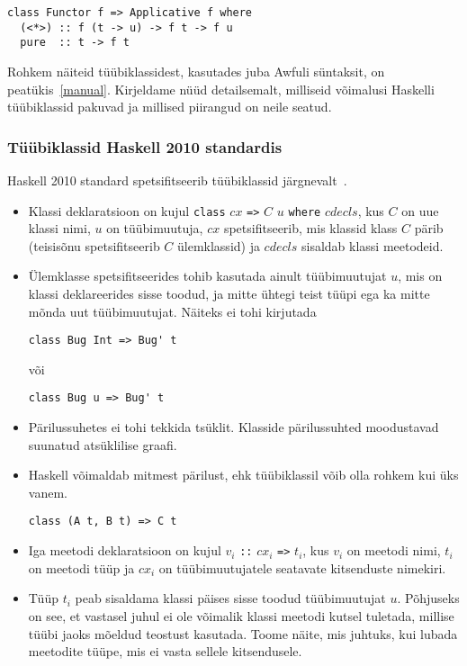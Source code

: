\documentclass[12pt]{article}
\begin{document}
      \begin{verbatim}class Functor f => Applicative f where
  (<*>) :: f (t -> u) -> f t -> f u
  pure  :: t -> f t\end{verbatim}

      Rohkem näiteid tüübiklassidest, kasutades juba Awfuli süntaksit, on peatükis~\ref{manual}. Kirjeldame nüüd detailsemalt, milliseid võimalusi Haskelli tüübiklassid pakuvad ja millised piirangud on neile seatud.
      \subsubsection{Tüübiklassid Haskell 2010 standardis}
        Haskell 2010 standard spetsifitseerib tüübiklassid järgnevalt~\cite{Has}.
        \begin{itemize}
          \item
            Klassi deklaratsioon on kujul \verb!class! $cx$ \verb!=>! $C$ $u$ \verb!where! $cdecls$, kus $C$ on uue klassi nimi, $u$ on tüübimuutuja, $cx$ spetsifitseerib, mis klassid klass $C$ pärib (teisisõnu spetsifitseerib $C$ ülemklassid) ja $cdecls$ sisaldab klassi meetodeid.
          \item
            Ülemklasse spetsifitseerides tohib kasutada ainult tüübimuutujat $u$, mis on klassi deklareerides sisse toodud, ja mitte ühtegi teist tüüpi ega ka mitte mõnda uut tüübimuutujat. Näiteks ei tohi kirjutada

            \begin{verbatim}class Bug Int => Bug' t\end{verbatim}

            või

            \begin{verbatim}class Bug u => Bug' t\end{verbatim}
          \item
            Pärilussuhetes ei tohi tekkida tsüklit. Klasside pärilussuhted moodustavad suunatud atsüklilise graafi.
          \item
            Haskell võimaldab mitmest pärilust, ehk tüübiklassil võib olla rohkem kui üks vanem.

            \begin{verbatim}class (A t, B t) => C t\end{verbatim}
          \item
            Iga meetodi deklaratsioon on kujul $v_i$ \verb!::! $cx_i$ \verb!=>! $t_i$, kus $v_i$ on meetodi nimi, $t_i$ on meetodi tüüp ja $cx_i$ on tüübimuutujatele seatavate kitsenduste nimekiri.
          \item
            Tüüp $t_i$ peab sisaldama klassi päises sisse toodud tüübimuutujat $u$. Põhjuseks on see, et vastasel juhul ei ole võimalik klassi meetodi kutsel tuletada, millise tüübi jaoks mõeldud teostust kasutada. Toome näite, mis juhtuks, kui lubada meetodite tüüpe, mis ei vasta sellele kitsendusele.


\end{itemize}
\end{document}
